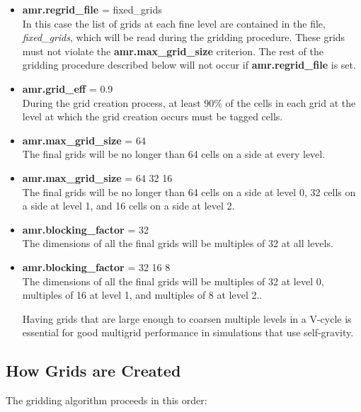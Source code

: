 \begin{itemize} 

\item {\bf amr.regrid\_file} = fixed\_grids \\ 
In this case the list of grids at each fine level are contained in the file, {\em fixed\_grids},
which will be read during the gridding procedure.  These grids must not violate the
{\bf amr.max\_grid\_size} criterion.   The rest of the gridding procedure described below
will not occur if {\bf amr.regrid\_file} is set.

\item {\bf amr.grid\_eff} = 0.9\\ 
During the grid creation process, at least 90\% of the cells in each grid at the
level at which the grid creation occurs must be tagged cells.  

\item {\bf amr.max\_grid\_size} = 64 \\ 
The final grids will be no longer than 64 cells on a side at every level.

\item {\bf amr.max\_grid\_size} = 64 32 16 \\ 
The final grids will be no longer than 64 cells on a side
at level 0, 32 cells on a side at level 1, and 16 cells on a side at level 2.

\item {\bf amr.blocking\_factor} = 32 \\
The dimensions of all the final grids will be multiples of 32 at all levels.

\item {\bf amr.blocking\_factor} = 32 16 8\\
The dimensions of all the final grids will be multiples of 32
at level 0, multiples of 16 at level 1, and multiples of 8 at level 2..  

Having grids that are large enough to coarsen multiple levels in a V-cycle is essential
for good multigrid performance in simulations that use self-gravity.

\end{itemize}

\subsection{How Grids are Created}

\noindent The gridding algorithm proceeds in this order:


